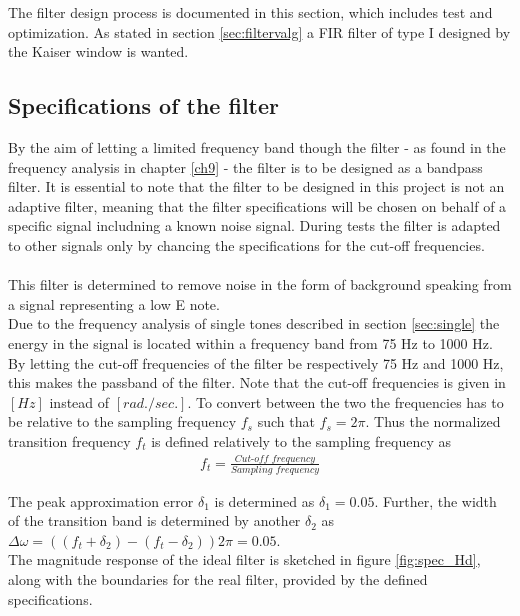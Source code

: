 The filter design process is documented in this section, which includes test and optimization. As stated in section \ref{sec:filtervalg} a FIR filter of type I designed by the Kaiser window is wanted.

\subsection{Specifications of the filter} \label{sec:FIRspec} 
By the aim of letting a limited frequency band though the filter - as found in the frequency analysis in chapter \ref{ch9} - the filter is to be designed as a bandpass filter. It is essential to note that the filter to be designed in this project is not an adaptive filter, meaning that the filter specifications will be chosen on behalf of a specific signal includning a known noise signal. During tests the filter is adapted to other signals only by chancing the specifications for the cut-off frequencies. \\ \\
This filter is determined to remove noise in the form of background speaking from a signal representing a low E note. \\
Due to the frequency analysis of single tones described in section \ref{sec:single} the energy in the signal is located within a frequency band from 75 Hz to 1000 Hz.  
By letting the cut-off frequencies of the filter be respectively 75 Hz and 1000 Hz, this makes the passband of the filter. Note that the cut-off frequencies is given in $[Hz]$ instead of $[rad./sec.]$. To convert between the two the frequencies has to be relative to the sampling frequency $f_s$ such that $f_s = 2\pi$. Thus the normalized transition frequency $f_t$ is defined relatively to the sampling frequency as
\begin{align}
f_t = \frac{\textit{Cut-off frequency}}{\textit{Sampling frequency}}
\end{align}

The peak approximation error $\delta_1$ is determined as $\delta_1=0.05$. Further, the width of the transition band is determined by another $\delta_2$ as $\Delta \omega = ((f_t + \delta_2)-(f_t - \delta_2))2\pi= 0.05$.\\
The magnitude response of the ideal filter is sketched in figure \ref{fig:spec_Hd}, along with the boundaries for the real filter, provided by the defined specifications.      

